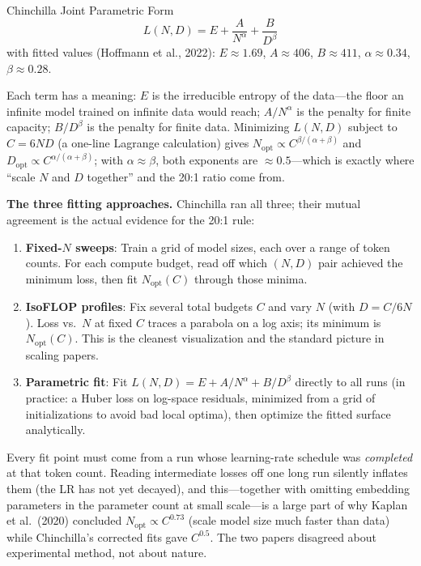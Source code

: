 \begin{mathresult}{Chinchilla Joint Parametric Form}
\begin{equation}
L(N, D) = E + \frac{A}{N^{\alpha}} + \frac{B}{D^{\beta}}
\end{equation}
with fitted values (Hoffmann et al., 2022): $E \approx 1.69$, $A \approx 406$, $B \approx 411$, $\alpha \approx 0.34$, $\beta \approx 0.28$.
\end{mathresult}

Each term has a meaning: $E$ is the irreducible entropy of the data---the floor an infinite model trained on infinite data would reach; $A/N^{\alpha}$ is the penalty for finite capacity; $B/D^{\beta}$ is the penalty for finite data. Minimizing $L(N,D)$ subject to $C = 6ND$ (a one-line Lagrange calculation) gives $N_{\text{opt}} \propto C^{\beta/(\alpha+\beta)}$ and $D_{\text{opt}} \propto C^{\alpha/(\alpha+\beta)}$; with $\alpha \approx \beta$, both exponents are $\approx 0.5$---which is exactly where ``scale $N$ and $D$ together'' and the 20:1 ratio come from.

\textbf{The three fitting approaches.} Chinchilla ran all three; their mutual agreement is the actual evidence for the 20:1 rule:
\begin{enumerate}
    \item \textbf{Fixed-$N$ sweeps}: Train a grid of model sizes, each over a range of token counts. For each compute budget, read off which $(N, D)$ pair achieved the minimum loss, then fit $N_{\text{opt}}(C)$ through those minima.
    \item \textbf{IsoFLOP profiles}: Fix several total budgets $C$ and vary $N$ (with $D = C/6N$). Loss vs.\ $N$ at fixed $C$ traces a parabola on a log axis; its minimum is $N_{\text{opt}}(C)$. This is the cleanest visualization and the standard picture in scaling papers.
    \item \textbf{Parametric fit}: Fit $L(N,D) = E + A/N^{\alpha} + B/D^{\beta}$ directly to all runs (in practice: a Huber loss on log-space residuals, minimized from a grid of initializations to avoid bad local optima), then optimize the fitted surface analytically.
\end{enumerate}

\begin{warningbox}
Every fit point must come from a run whose learning-rate schedule was \textit{completed} at that token count. Reading intermediate losses off one long run silently inflates them (the LR has not yet decayed), and this---together with omitting embedding parameters in the parameter count at small scale---is a large part of why Kaplan et al.\ (2020) concluded $N_{\text{opt}} \propto C^{0.73}$ (scale model size much faster than data) while Chinchilla's corrected fits gave $C^{0.5}$. The two papers disagreed about experimental method, not about nature.
\end{warningbox}

